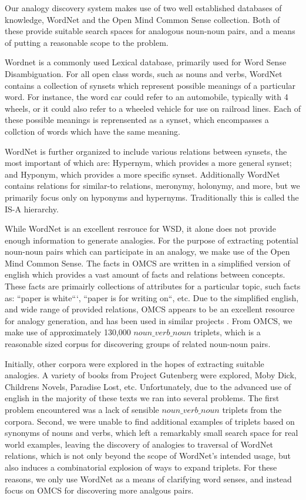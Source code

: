 \documentclass[11pt]{article}
\begin{document}
Our analogy discovery system makes use of two well established databases of
knowledge, WordNet \cite{fellbaum98wordnet} and the Open Mind Common Sense
\cite{havasi07conceptnet} collection.  Both of these provide suitable search
spaces for analogous noun-noun pairs, and a means of putting a reasonable scope
to the problem.

Wordnet \cite{fellbaum98wordnet} is a commonly used Lexical database, primarily used for Word Sense
Disambiguation.  For all open class words, such as nouns and verbs, WordNet
contains a collection of synsets which represent possible meanings of a
particular word.  For instance, the word car could refer to an automobile,
typically with 4 wheels, or it could also refer to a wheeled vehicle for use on
railroad lines.  Each of these possible meanings is reprensented as a synset,
which encompasses a collction of words which have the same meaning.

WordNet is further organized to include various relations between synsets, the
most important of which are: Hypernym, which provides a more general synset;
and Hyponym, which provides a more specific synset.  Additionally WordNet
contains relations for similar-to relations, meronymy, holonymy, and more, but
we primarily focus only on hyponyms and hypernyms.  Traditionally this is called
the IS-A hierarchy.

While WordNet is an excellent resrouce for WSD, it alone does not provide enough
information to generate analogies.  For the purpose of extracting potential
noun-noun pairs which can participate in an analogy, we make use of the Open
Mind Common Sense.  The facts in OMCS are written in a simplified version of
english which provides a vast amount of facts and relations between concepts.
These facts are primairly collections of attributes for a particular topic, such
facts as: ``paper is white```, ``paper is for writing on``, etc.  Due to the
simplified english, and wide range of provided relations, OMCS appears to be an
excellent resource for analogy generation, and has been used in similar projects
\cite{speer08analogyspace}.  From OMCS, we make use of approximately 130,000
$noun\_verb\_noun$ triplets, which is a reasonable sized corpus for discovering
groups of related noun-noun pairs.


Initially, other corpora were explored in the hopes of extracting suitable
analogies.  A variety of books from Project Gutenberg were explored, Moby Dick,
Childrens Novels, Paradise Lost, etc.  Unfortunately, due to the advanced use of
english in the majority of these texts we ran into several problems.  The first
problem encountered was a lack of sensible $noun\_verb\_noun$ triplets from the
corpora.  Second, we were unable to find additional examples of triplets based
on synonyms of nouns and verbs, which left a remarkably small search space for
real world examples, leaving the discovery of analogies to traversal of WordNet
relations, which is not only beyond the scope of WordNet's intended usage, but
also induces a combinatorial explosion of ways to expand triplets.  For these
reasons, we only use WordNet as a means of clarifying word senses, and instead
focus on OMCS for discovering more analgous pairs.
\end{document}
